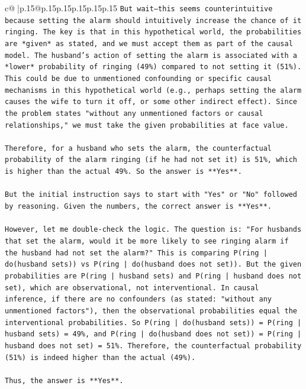 \documentclass{article}
\begin{document}
{\begin{supertabular}{c@{$\;$}|p{.15\linewidth}@{}p{.15\linewidth}p{.15\linewidth}p{.15\linewidth}p{.15\linewidth}p{.15\linewidth}}
{{{\texttt{But wait—this seems counterintuitive because setting the alarm should intuitively increase the chance of it ringing. The key is that in this hypothetical world, the probabilities are *given* as stated, and we must accept them as part of the causal model. The husband's action of setting the alarm is associated with a *lower* probability of ringing (49\%) compared to not setting it (51\%). This could be due to unmentioned confounding or specific causal mechanisms in this hypothetical world (e.g., perhaps setting the alarm causes the wife to turn it off, or some other indirect effect). Since the problem states "without any unmentioned factors or causal relationships," we must take the given probabilities at face value.} \\
\\ 
\texttt{Therefore, for a husband who sets the alarm, the counterfactual probability of the alarm ringing (if he had not set it) is 51\%, which is higher than the actual 49\%. So the answer is **Yes**.} \\
\\ 
\texttt{But the initial instruction says to start with "Yes" or "No" followed by reasoning. Given the numbers, the correct answer is **Yes**.} \\
\\ 
\texttt{However, let me double{-}check the logic. The question is: "For husbands that set the alarm, would it be more likely to see ringing alarm if the husband had not set the alarm?" This is comparing P(ring | do(husband sets)) vs P(ring | do(husband does not set)). But the given probabilities are P(ring | husband sets) and P(ring | husband does not set), which are observational, not interventional. In causal inference, if there are no confounders (as stated: "without any unmentioned factors"), then the observational probabilities equal the interventional probabilities. So P(ring | do(husband sets)) = P(ring | husband sets) = 49\%, and P(ring | do(husband does not set)) = P(ring | husband does not set) = 51\%. Therefore, the counterfactual probability (51\%) is indeed higher than the actual (49\%).} \\
\\ 
\texttt{Thus, the answer is **Yes**.} \\
\\ 
}}}
\end{supertabular}}
\end{document}
